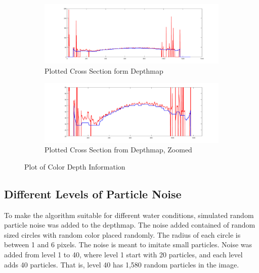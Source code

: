 \begin{figure}[H]
    \centering
    \begin{subfigure}{1\textwidth}
        \centering
        \includegraphics[width=1\linewidth]{images/results/plot_row}
        \caption{Plotted Cross Section form Depthmap} 
        \label{fig:plot1}
    \end{subfigure}\hspace*{\fill}
    
    \medskip
    \begin{subfigure}{1\textwidth}
        \centering
        \includegraphics[width=1\linewidth]{images/results/plot_zoomed}
        \caption{Plotted Cross Section from Depthmap, Zoomed} 
        \label{fig:plot2}
    \end{subfigure}\hspace*{\fill}
    \caption{Plot of Color Depth Information}
    \label{fig:row_plot}
\end{figure}




\subsection{Different Levels of Particle Noise} \label{section:noise}

To make the algorithm suitable for different water conditions, simulated random particle noise was added to the depthmap. The noise added contained of random sized circles with random color placed randomly. The radius of each circle is between 1 and 6 pixels. The noise is meant to imitate small particles.
Noise was added from level 1 to 40, where level 1 start with 20 particles, and each level adds 40 particles. That is, level 40 has 1,580 random particles in the image.

